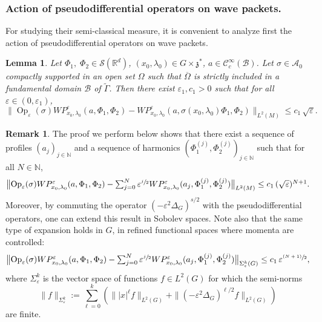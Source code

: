 \documentclass[JEP,XML,SOM,Unicode,published]{cedram}
\let\mathcal\mathscr
\newcommand{\psfrac}[2]{\sfrac{(#1)}{#2}}
\DeclareMathOperator{\Op}{Op}
\theoremstyle{plain}
\newtheorem{lemma}[theorem]{Lemma}
\theoremstyle{definition}
\newtheorem{remark}[theorem]{Remark}
\let\eps\varepsilon
\def\R{{\mathbb R}}
\def\N{{\mathbb N}}
\begin{document}
\subsubsection{Action of pseudodifferential operators on wave packets. }

For studying their semi-classical measure, it is convenient to analyze first the action of pseudodifferential operators on wave packets.

\begin{lemma}\label{lem:pseudo}
Let $\Phi_1,\;\Phi_2\in\mathcal S(\R^d)$, $(x_0,\lambda_0)\in G\times \mathfrak z^*$, $a\in{\mathcal C}^\infty_c(\mathcal B)$. Let $\sigma\in{{\mathcal A}_0}$ compactly supported in an open set $\Omega$ such that $\overline \Omega$ is strictly included in a fundamental domain $\mathcal B$ of $\widetilde \Gamma$. Then there exist $\eps_1, c_1>0$ such that for all $\eps\in(0,\eps_1)$,
\[
\bigl\| \Op_\eps(\sigma) WP^\eps_{x_0,\lambda_0}(a,\Phi_1,\Phi_2)- WP^\eps_{x_0,\lambda_0}(a,\sigma(x_0,\lambda_0)\Phi_1,\Phi_2) \bigr\|_{L^2(M)} \leq c_1\, \sqrt\eps.
\]
\end{lemma}

\begin{remark} \label{rem:asympexpansion}
The proof we perform below shows that there exist a sequence of profiles $(a_j)_{j\in\N}$ and a sequence of harmonics $(\Phi_1^{(j)}, \Phi_2^{(j)})_{j\in\N}$ such that for all $N\in\N$,
\[\textstyle
\bigl\| \Op_\eps(\sigma) WP^\eps_{x_0,\lambda_0}(a,\Phi_1,\Phi_2)- \sum_{j=0}^N \eps^{\sfrac j 2} WP^\eps_{x_0,\lambda_0}(a_j,\Phi_1^{(j)},\Phi_2^{(j)}) \bigr\|_{L^2(M)} \leq c_1\, (\sqrt\eps)^{N+1}.
\]
Moreover, by commuting the operator $(-\eps^2 \Delta_G)^{s/2}$ with the pseudodifferential operators, one can extend this result in Sobolev spaces.
Note also that the same type of expansion holds in $G$, in refined functional spaces where momenta are controlled:
\[\textstyle
\bigl\| \Op_\eps(\sigma) WP^\eps_{x_0,\lambda_0}(a,\Phi_1,\Phi_2)- \sum_{j=0}^N \eps^{\sfrac j 2} WP^\eps_{x_0,\lambda_0}(a_j,\Phi_1^{(j)},\Phi_2^{(j)}) \bigr\|_{\Sigma^k_\eps(G)} \leq c_1\, \eps^{\psfrac{N+1}{2}},
\]
where $\Sigma^k_\eps$ is the vector space of functions $f\in L^2(G)$ for which the semi-norms
\begin{equation} \label{e:Sigmakeps}
\| f\|_{\Sigma^k_\eps} := \sum_{\ell=0}^k\left(\| |x|^\ell f\|_{L^2(G)} + \| (-\eps^2 \Delta_G)^{\ell/2} f\|_{L^2(G)}\right)
\end{equation}
are finite.
\end{remark}
\end{document}

